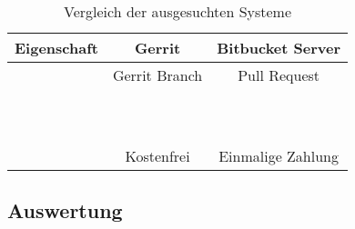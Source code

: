 \begin{table}[h]
	\caption[Vergleichstabelle der ausgesuchten Systeme]{Vergleich der ausgesuchten Systeme}
	\centering
	\begin{tabular}{|c|c|c|}
			\hline 
			Eigenschaft & \textbf{Gerrit} & \textbf{Bitbucket Server} \\ 
			\hline 
			\textbf{\color{blue}{Review Workflow}} & Gerrit Branch & Pull Request \\ 
			\hline 
			\textbf{\color{blue}{Inline Diffs}} & \color{green}{\ja} & \color{green}{\ja} \\ 
			\hline 
			\textbf{\color{blue}{side by side Diffs}} & \color{green}{\ja} & \color{green}{\ja} \\ 
			\hline 
			\textbf{\color{blue}{Zugriffskontrolle auf Repo.}} & \color{green}{\ja} & \color{green}{\ja} \\ 
			\hline 
			\textbf{\color{blue}{Zugriffskontrolle auf den Reviews}} & \color{green}{\ja} & \color{green}{\ja} \\ 
			\hline 
			\textbf{\color{blue}{Vorschläge annehmen}} & \color{green}{\ja} & \color{green}{\ja} \\ 
			\hline 
			\textbf{\color{blue}{Patchsets}} & \color{green}{\ja} & \color{red}{\nein} \\ 
			\hline 
			\textbf{\color{blue}{E-Mail Benachrichtigungen}} & \color{green}{\ja} & \color{green}{\ja} \\ 
			\hline 
			\textbf{\color{blue}{Task-Liste}} & \color{red}{\nein} & \color{green}{\ja} \\
			\hline 
			\textbf{\color{blue}{Direkt Forken}} & \color{red}{\nein} & \color{green}{\ja} \\
			\hline 
			\textbf{\color{blue}{Diffs zwischen Commits/Tags/Branchs}} & \color{red}{\nein} & \color{green}{\ja} \\
			\hline 
			\textbf{\color{blue}{Kosten}} & Kostenfrei & Einmalige Zahlung \\
			\hline 
	\end{tabular} 
	\label{table:Vergleichstabelle Gerrit & Bitbucket}
\end{table}


\subsection{Auswertung}
\label{subsec:Auswertung}
